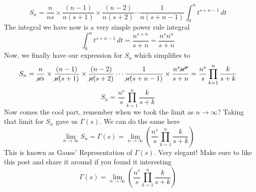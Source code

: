 \documentclass{article}
\begin{document}
{$$S_n = \frac{n}{ns} \times \frac{(n-1)}{n(s+1)} \times \frac{(n-2)}{n(s+2)} \cdots \frac{1}{n(s+n-1)} \int_0^{n} t^{s+n-1} \,dt$$
\newpage
The integral we have now is a very simple power rule integral
$$ \int_0^{n} t^{s+n-1} \,dt = \frac{n^{s+n}}{s+n} = \frac{n^s n^n}{s+n}
$$
Now, we finally have our expression for $S_n$ which simplifies to
$$ S_n = \frac{n}{\cancel{n}s} \times \frac{(n-1)}{\cancel{n}(s+1)} \times \frac{(n-2)}{\cancel{n}(s+2)} \cdots \frac{1}{\cancel{n}(s+n-1)} \times \frac{n^s \cancel{n^n}}{s+n}= \frac{n^s}{s} \prod_{k=1}^n \frac{k}{s+k} $$
$$S_n = \frac{n^s}{s} \prod_{k=1}^n \frac{k}{s+k} $$
Now comes the cool part, remember when we took the limit as $n \to \infty$? Taking that limit for $S_n$ gave us $\Gamma(s)$. We can do the same here
$$ \lim_{n\to\infty} S_n = \Gamma(s) = \lim_{n\to\infty} \left(\frac{n^s}{s} \prod_{k=1}^{n} \frac{k}{s+k}\right)  $$
This is known as Gauss' Representation of $\Gamma(s)$. Very elegant! Make sure to like this post and share it around if you found it interesting
\newpage
$$ \Gamma(s) = \lim_{n \to \infty} \left(\frac{n^s}{s} \prod_{k=1}^{n} \frac{k}{s+k}  \right) $$
}
\end{document}

